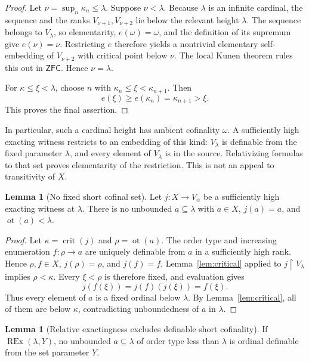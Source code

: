 \documentclass[11pt,letterpaper]{article}
\theoremstyle{definition}
\newtheorem{lemma}[definition]{Lemma}
\newcommand{\ZFC}{\mathsf{ZFC}}
\newcommand{\crit}{\operatorname{crit}}
\newcommand{\ot}{\operatorname{ot}}
\newcommand{\restr}{\mathbin{\upharpoonright}}
\newcommand{\REx}{\operatorname{REx}}
\begin{document}
\begin{proof}
Let $\nu=\sup_n\kappa_n\leq\lambda$. Suppose $\nu<\lambda$. Because $\lambda$
is an infinite cardinal, the sequence and the ranks $V_{\nu+1},V_{\nu+2}$ lie
below the relevant height $\lambda$. The sequence belongs to $V_\lambda$,
so elementarity, $e(\omega)=\omega$, and the definition of its supremum give
$e(\nu)=\nu$. Restricting $e$ therefore yields a nontrivial elementary
self-embedding of $V_{\nu+2}$ with critical point below $\nu$. The local
Kunen theorem rules this out in $\ZFC$. Hence $\nu=\lambda$.

For $\kappa\leq\xi<\lambda$, choose $n$ with
$\kappa_n\leq\xi<\kappa_{n+1}$. Then
\[
 e(\xi)\geq e(\kappa_n)=\kappa_{n+1}>\xi.
\]
This proves the final assertion.
\end{proof}

In particular, such a cardinal height has ambient cofinality $\omega$.
A sufficiently high exacting witness restricts to an embedding of this kind:
$V_\lambda$ is definable from the fixed parameter $\lambda$, and every element
of $V_\lambda$ is in the source. Relativizing formulas to that set proves
elementarity of the restriction. This is not an appeal to transitivity of $X$.

\begin{lemma}[No fixed short cofinal set]\label{lem:fixedcofinal}
Let $j:X\to V_\alpha$ be a sufficiently high exacting witness at $\lambda$.
There is no unbounded $a\subseteq\lambda$ with $a\in X$, $j(a)=a$, and
$\ot(a)<\lambda$.
\end{lemma}

\begin{proof}
Let $\kappa=\crit(j)$ and $\rho=\ot(a)$. The order type and increasing
enumeration $f:\rho\to a$ are uniquely definable from $a$ in a sufficiently
high rank. Hence $\rho,f\in X$, $j(\rho)=\rho$, and $j(f)=f$.
Lemma~\ref{lem:critical} applied to $j\restr V_\lambda$ implies $\rho<\kappa$.
Every $\xi<\rho$ is therefore fixed, and evaluation gives
\[
 j(f(\xi))=j(f)(j(\xi))=f(\xi).
\]
Thus every element of $a$ is a fixed ordinal below $\lambda$. By
Lemma~\ref{lem:critical}, all of them are below $\kappa$, contradicting
unboundedness of $a$ in $\lambda$.
\end{proof}

\begin{lemma}[Relative exactingness excludes definable short cofinality]
\label{lem:relative}
If $\REx(\lambda,Y)$, no unbounded $a\subseteq\lambda$ of order type less than
$\lambda$ is ordinal definable from the set parameter $Y$.
\end{lemma}
\end{document}

